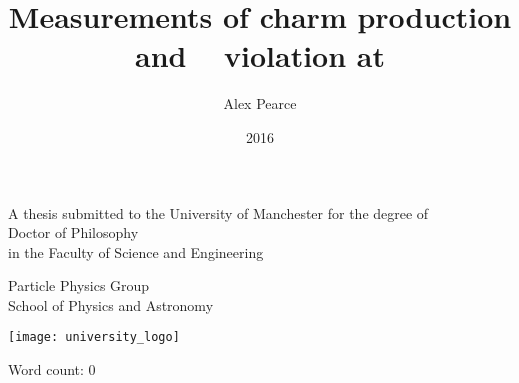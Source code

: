 \documentclass[a4paper,11pt]{memoir}
\author{Alex Pearce}
\title{%
  Measurements of charm production and \texorpdfstring{\CP\ }{CP} violation at \lhcb
}
\date{2016}
\begin{document}
\begin{titlingpage}
  \begin{center}
    \textbf{\huge\thetitle}

    \vfill

    A thesis submitted to the University of Manchester for the degree of\\
    Doctor of Philosophy\\
    in the Faculty of Science and Engineering\\

    \vspace{0.8cm}

    \textbf{\thedate}

    \vfill

    \textbf{\theauthor}

    \vspace{0.8cm}

    Particle Physics Group\\
    School of Physics and Astronomy\\

    \vspace{0.8cm}

    \texttt{[image: university\_logo]}

    \iftoggle{draft}{%
      \vspace{0.8cm}
      \texttt{Draft generated on \today}
    }{}
  \end{center}
\end{titlingpage}

\frontmatter

\tableofcontents*

\vspace{1cm}
\noindent
Word count: 0

\cleardoublepage



\cleardoublepage



\cleardoublepage



\cleardoublepage



\cleardoublepage


\end{document}
